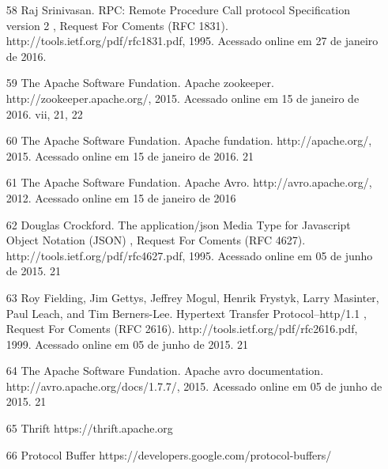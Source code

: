 \documentclass[engenharia]{UnB-CIC}%
\newcommand{\unbcic}{\texttt{UnB-CIC}}%
\begin{document}
\begin{itemize}
	\item [58] Raj Srinivasan. RPC: Remote Procedure Call protocol Specification version 2 , Request For Coments (RFC 1831). http://tools.ietf.org/pdf/rfc1831.pdf, 1995. Acessado online em 27 de janeiro de 2016.
	\item [59] The Apache Software Fundation. Apache zookeeper. http://zookeeper.apache.org/, 2015. Acessado online em 15 de janeiro de 2016. vii, 21, 22
	\item [60] The Apache Software Fundation. Apache fundation. http://apache.org/, 2015. Acessado online em 15 de janeiro de 2016. 21
	\item [61] The Apache Software Fundation. Apache Avro. http://avro.apache.org/, 2012. Acessado online em 15 de janeiro de 2016
	\item [62] Douglas Crockford. The application/json Media Type for Javascript Object Notation (JSON) , Request For Coments (RFC 4627). http://tools.ietf.org/pdf/rfc4627.pdf, 1995. Acessado online em 05 de junho de 2015. 21
	\item [63] Roy Fielding, Jim Gettys, Jeffrey Mogul, Henrik Frystyk, Larry Masinter, Paul Leach, and Tim Berners-Lee. Hypertext Transfer Protocol–http/1.1 , Request For Coments (RFC 2616). http://tools.ietf.org/pdf/rfc2616.pdf, 1999. Acessado online em 05 de junho de 2015. 21
	\item [64] The Apache Software Fundation. Apache avro documentation. http://avro.apache.org/docs/1.7.7/, 2015. Acessado online em 05 de junho de 2015. 21
    \item [65] Thrift https://thrift.apache.org
    \item [66] Protocol Buffer https://developers.google.com/protocol-buffers/
\end{itemize}

\end{document}
